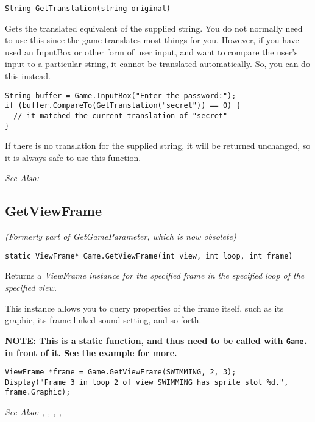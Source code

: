 \begin{verbatim}
String GetTranslation(string original)
\end{verbatim}
Gets the translated equivalent of the supplied string. You do not normally
need to use this since the game translates most things for you. However,
if you have used an InputBox or other form of user input, and want to
compare the user's input to a particular string, it cannot be translated
automatically. So, you can do this instead.

\begin{verbatim}
String buffer = Game.InputBox("Enter the password:");
if (buffer.CompareTo(GetTranslation("secret")) == 0) {
  // it matched the current translation of "secret"
}
\end{verbatim}
If there is no translation for the supplied string, it will be returned
unchanged, so it is always safe to use this function.

\it{See Also:} 


\subsection{GetViewFrame}\label{Game.GetViewFrame}%

\it{(Formerly part of GetGameParameter, which is now obsolete)}

\begin{verbatim}
static ViewFrame* Game.GetViewFrame(int view, int loop, int frame)
\end{verbatim}
Returns a \it{ViewFrame} instance for the specified frame in the specified loop of the specified view.

This instance allows you to query properties of the frame itself, such as its graphic, its frame-linked
sound setting, and so forth.

\bf{NOTE:} This is a static function, and thus need to be called with \verb$Game.$ in front of it. See
the example for more.

\begin{verbatim}
ViewFrame *frame = Game.GetViewFrame(SWIMMING, 2, 3);
Display("Frame 3 in loop 2 of view SWIMMING has sprite slot %d.", frame.Graphic);
\end{verbatim}

\it{See Also:} ,
,
,
, 


